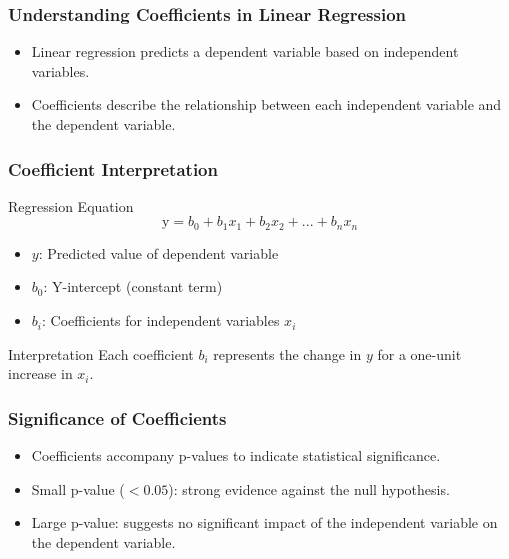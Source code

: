 \documentclass[aspectratio=169]{beamer}
\begin{document}
\begin{frame}[fragile]
    \frametitle{Understanding Coefficients in Linear Regression}
    \begin{itemize}
        \item Linear regression predicts a dependent variable based on independent variables.
        \item Coefficients describe the relationship between each independent variable and the dependent variable.
    \end{itemize}
\end{frame}

\begin{frame}[fragile]
    \frametitle{Coefficient Interpretation}
    \begin{block}{Regression Equation}
        \begin{equation}
        \text{y} = b_0 + b_1x_1 + b_2x_2 + ... + b_nx_n
        \end{equation}
    \end{block}
    \begin{itemize}
        \item \( y \): Predicted value of dependent variable
        \item \( b_0 \): Y-intercept (constant term)
        \item \( b_i \): Coefficients for independent variables \( x_i \)
    \end{itemize}
    \begin{block}{Interpretation}
        Each coefficient \( b_i \) represents the change in \( y \) for a one-unit increase in \( x_i \).
    \end{block}
\end{frame}

\begin{frame}[fragile]
    \frametitle{Significance of Coefficients}
    \begin{itemize}
        \item Coefficients accompany p-values to indicate statistical significance.
        \item Small p-value (\(< 0.05\)): strong evidence against the null hypothesis.
        \item Large p-value: suggests no significant impact of the independent variable on the dependent variable.
    \end{itemize}
\end{frame}
\end{document}

